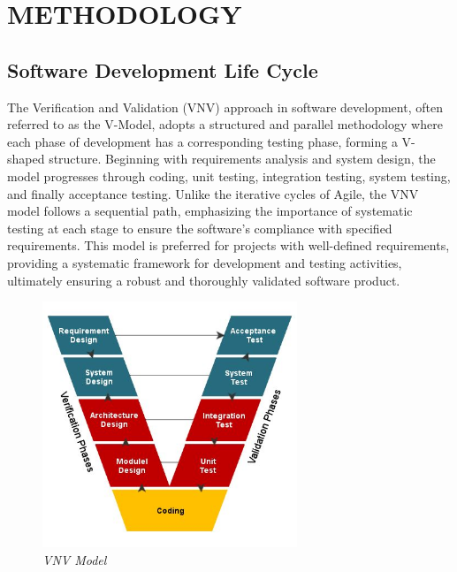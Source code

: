 

\section{METHODOLOGY}
\subsection{Software Development Life Cycle}
\justify

The Verification and Validation (VNV) approach in software development, often referred to as the V-Model, adopts a structured and parallel methodology where each phase of development has a corresponding testing phase, forming a V-shaped structure. Beginning with requirements analysis and system design, the model progresses through coding, unit testing, integration testing, system testing, and finally acceptance testing. Unlike the iterative cycles of Agile, the VNV model follows a sequential path, emphasizing the importance of systematic testing at each stage to ensure the software's compliance with specified requirements. This model is preferred for projects with well-defined requirements, providing a systematic framework for development and testing activities, ultimately ensuring a robust and thoroughly validated software product. \\
\vspace{0.2 in}
\begin{figure}[h]
    \centering
    \includegraphics[width= 3in ]{img/VnV.jpg}
    \caption{\textit{VNV Model}}
\end{figure}
